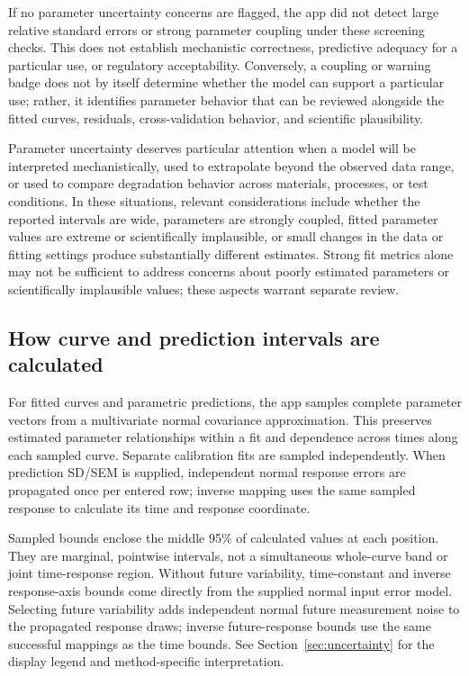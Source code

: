 If no parameter uncertainty concerns are flagged, the app did not detect large relative standard errors or strong parameter coupling under these screening checks. This does not establish mechanistic correctness, predictive adequacy for a particular use, or regulatory acceptability. Conversely, a coupling or warning badge does not by itself determine whether the model can support a particular use; rather, it identifies parameter behavior that can be reviewed alongside the fitted curves, residuals, cross-validation behavior, and scientific plausibility.

Parameter uncertainty deserves particular attention when a model will be interpreted mechanistically, used to extrapolate beyond the observed data range, or used to compare degradation behavior across materials, processes, or test conditions. In these situations, relevant considerations include whether the reported intervals are wide, parameters are strongly coupled, fitted parameter values are extreme or scientifically implausible, or small changes in the data or fitting settings produce substantially different estimates. Strong fit metrics alone may not be sufficient to address concerns about poorly estimated parameters or scientifically implausible values; these aspects warrant separate review.

\subsection{How curve and prediction intervals are calculated}
\label{app:uncertainty-calculation}

For fitted curves and parametric predictions, the app samples complete parameter vectors from a multivariate normal covariance approximation. This preserves estimated parameter relationships within a fit and dependence across times along each sampled curve. Separate calibration fits are sampled independently. When prediction SD/SEM is supplied, independent normal response errors are propagated once per entered row; inverse mapping uses the same sampled response to calculate its time and response coordinate.

Sampled bounds enclose the middle 95\% of calculated values at each position. They are marginal, pointwise intervals, not a simultaneous whole-curve band or joint time-response region. Without future variability, time-constant and inverse response-axis bounds come directly from the supplied normal input error model. Selecting future variability adds independent normal future measurement noise to the propagated response draws; inverse future-response bounds use the same successful mappings as the time bounds. See Section~\ref{sec:uncertainty} for the display legend and method-specific interpretation.

